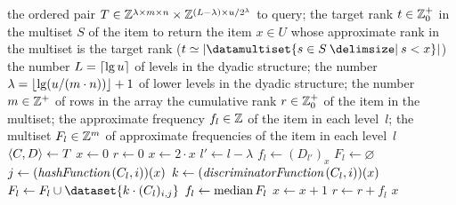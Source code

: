\begin{algorithmic}[1]
  \In the ordered pair \( \cramped{T \in \integers^{\lambda \times m \times n} \times \integers^{(L - \lambda) \times u / 2^{\lambda}}} \) to query; the target rank \( t \in \mathbb{Z}_{0}^{+} \) in the multiset \( S \) of the item to return
  \Out the item \( x \in U \) whose approximate rank in the multiset is the target rank (\( t \simeq \cardinality{\datamultiset{s \in S \suchthat s < x}} \))
  \Constant the number \( L = \lceil\lg u\rceil \) of levels in the dyadic structure; the number \( \lambda = \lfloor\lg (u / (m \cdot n))\rfloor + 1 \) of lower levels in the dyadic structure; the number \( m \in \mathbb{Z}^{+} \) of rows in the array
  \Local the cumulative rank \( r \in \mathbb{Z}_{0}^{+} \) of the item in the multiset; the approximate frequency \( f_{l} \in \mathbb{Z} \) of the item in each level~\( l \); the multiset \( F_{l} \in \mathbb{Z}^{m} \) of approximate frequencies of the item in each level~\( l \)
    \State \( \langle C, D\rangle \gets T \)
    \State \( x \gets 0 \)
    \State \( r \gets 0 \)
      \State \( x \gets 2 \cdot x \) \label{line:dyadic-count-sketch-quantile-query-multiplication}
        \State \( l' \gets l - \lambda \)
        \State \( f_{l} \gets (D_{l'})_{x} \)
      \Else
        \State \( F_{l} \gets \varnothing \)
          \State \( j \gets (\hashFunction (C_{l}, i))(x) \)
          \State \( k \gets (\discriminatorFunction (C_{l}, i))(x) \)
          \State \( F_{l} \gets F_{l} \cup \dataset{k \cdot (C_{l})_{i, j}} \)
        \EndFor
        \State \( f_{l} \gets \operatorname*{median} F_{l} \)
      \EndIf
        \State \( x \gets x + 1 \)
        \State \( r \gets r + f_{l} \)
      \EndIf
    \EndFor
    \State \Return \( x \)
  \EndFunction
\end{algorithmic}
